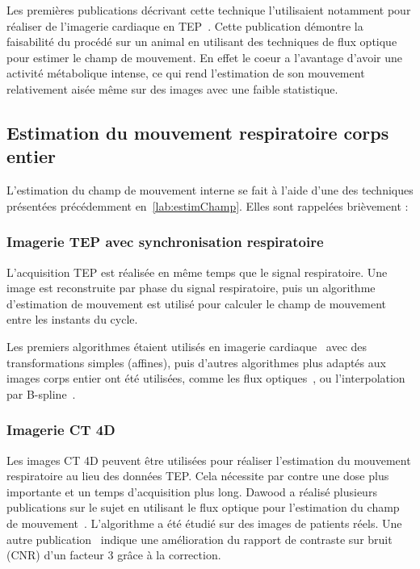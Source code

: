 Les premières publications décrivant cette technique l'utilisaient notamment pour réaliser de l'imagerie cardiaque en TEP~\cite{klein19973d}. Cette publication démontre la faisabilité du procédé sur un animal en utilisant des techniques de flux optique pour estimer le champ de mouvement. En effet le coeur a l'avantage d'avoir une activité métabolique intense, ce qui rend l'estimation de son mouvement relativement aisée même sur des images avec une faible statistique.




\subsection{Estimation du mouvement respiratoire corps entier}

L'estimation du champ de mouvement interne se fait à l'aide d'une des techniques présentées précédemment en~\ref{lab:estimChamp}. Elles sont rappelées brièvement :

\subsubsection{Imagerie TEP avec synchronisation respiratoire}
\label{lab:correctionDawood2008}

L'acquisition TEP est réalisée en même temps que le signal respiratoire. Une image est reconstruite par phase du signal respiratoire, puis un algorithme d'estimation de mouvement est utilisé pour calculer le champ de mouvement entre les instants du cycle.

Les premiers algorithmes étaient utilisés en imagerie cardiaque~\cite{klein2002four} avec des transformations simples (affines), puis d'autres algorithmes plus adaptés aux images corps entier ont été utilisées, comme les flux optiques~\cite{dawood2006lung, dawood2006lung}, ou l'interpolation par B-spline~\cite{bai2009regularized}. 


\subsubsection{Imagerie CT 4D}

Les images CT 4D peuvent être utilisées pour réaliser l'estimation du mouvement respiratoire au lieu des données TEP. Cela nécessite par contre une dose plus importante et un temps d'acquisition plus long.
Dawood a réalisé plusieurs publications sur le sujet en utilisant le flux optique pour l'estimation du champ de mouvement~\cite{dawood2006lung, dawood2008respiratory}. L'algorithme a été étudié sur des images de patients réels. Une autre publication~\cite{thorndyke2006reducing} indique une amélioration du rapport de contraste sur bruit (CNR) d'un facteur 3 grâce à la correction.



